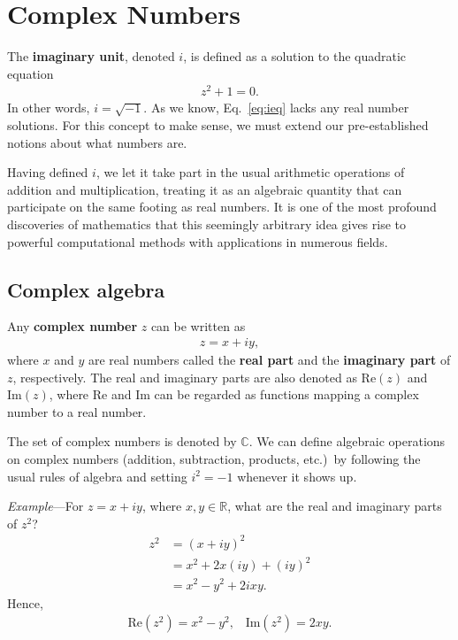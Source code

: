 \documentclass[10pt,a4paper]{article}
\begin{document}
\setcounter{page}{21}

\section{Complex Numbers}
\label{complex-numbers}

The \textbf{imaginary unit}, denoted $i$, is defined as a solution to
the quadratic equation
\begin{align}
  z^2 + 1 = 0.
  \label{eq:ieq}
\end{align}
In other words, $i = \sqrt{-1}$. As we know, Eq.~\eqref{eq:ieq} lacks
any real number solutions. For this concept to make sense, we must
extend our pre-established notions about what numbers are.

Having defined $i$, we let it take part in the usual arithmetic
operations of addition and multiplication, treating it as an algebraic
quantity that can participate on the same footing as real numbers. It
is one of the most profound discoveries of mathematics that this
seemingly arbitrary idea gives rise to powerful computational methods
with applications in numerous fields.

\subsection{Complex algebra}
\label{complex-algebra}

Any \textbf{complex number} $z$ can be written as
\begin{align}
  z = x + i y,
\end{align}
where $x$ and $y$ are real numbers called the \textbf{real part} and
the \textbf{imaginary part} of $z$, respectively.  The real and
imaginary parts are also denoted as $\mathrm{Re}(z)$ and
$\mathrm{Im}(z)$, where $\mathrm{Re}$ and $\mathrm{Im}$ can be
regarded as functions mapping a complex number to a real number.

The set of complex numbers is denoted by $\mathbb{C}$.  We can define
algebraic operations on complex numbers (addition, subtraction,
products, etc.)~by following the usual rules of algebra and setting
$i^2 = -1$ whenever it shows up.

\begin{framed}\noindent
  \textit{Example}---For $z = x + i y$, where $x, y \in \mathbb{R}$,
  what are the real and imaginary parts of $z^2$?
  \begin{align}
    z^2 &= (x+iy)^2 \\&= x^2 + 2x(iy) + (iy)^2 \\&= x^2 - y^2 + 2ixy.
  \end{align}
  Hence,
  \begin{align}
    \mathrm{Re}(z^2) = x^2 -y^2, \;\;\; \mathrm{Im}(z^2) = 2xy.
  \end{align}
\end{framed}
\end{document}
